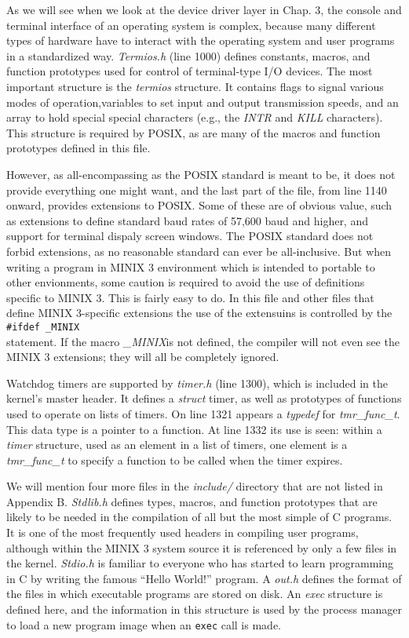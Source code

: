 \documentclass{book}
\newcommand {\sys} [1] {\textsl{#1}}
\newcommand {\cmd} [1] {\texttt{#1}}
\begin{document}
As we will see when we look at the device driver layer in Chap. 3,
the console and terminal interface of an operating system is complex,
because many different types of hardware have to interact with the operating system and user programs in a standardized way.
\sys{Termios.h} (line 1000) defines constants, macros, and function prototypes 
used for control of terminal-type I/O devices.
The most important structure is the \sys{termios} structure.
It contains flags to signal various modes of operation,variables to set input and output transmission speeds,
and an array to hold special special characters (e.g., the \sys{INTR} and \sys{KILL} characters).
This structure is required by POSIX,
as are many of the macros and function prototypes defined in this file.

However, as all-encompassing as the POSIX standard is meant to be, it does not provide everything one might want,
and the last part of the file, from line 1140 onward, provides extensions to POSIX.
Some of these are of obvious value, such as extensions to define standard baud rates of 57,600 baud and higher,
and support for terminal dispaly screen windows.
The POSIX standard does not forbid extensions, as no reasonable standard can ever be all-inclusive.
But when writing a program in MINIX 3 environment which is intended to portable to other envionments, 
some caution is required to avoid the use of definitions specific to MINIX 3.
This is fairly easy to do.
In this file and other files that define MINIX 3-specific extensions the use of the extensuins is controlled by the \\
\cmd{\#ifdef \_MINIX}\\
statement.
If the macro \sys{\_MINIX}is not defined, the compiler will not even see the MINIX 3 extensions;
they will all be completely ignored.

Watchdog timers are supported by \sys{timer.h} (line 1300),
which is included in the kernel's master header.
It defines a \sys{struct} timer, as well as prototypes of functions used to operate on lists of timers.
On line 1321 appears a \sys{typedef} for \sys{tmr\_func\_t}.
This data type is a pointer to a function.
At line 1332 its use is seen: within a \sys{timer} structure, used as an element in a list of timers,
one element is a \sys{tmr\_func\_t} to specify a function to be called when the timer expires.

We will mention four more files in the \sys{include/} directory that are not listed in Appendix B.
\sys{Stdlib.h} defines types, macros, and function prototypes 
that are likely to be needed in the compilation of all but the most simple of C programs.
It is one of the most frequently used headers in compiling user programs,
although within the MINIX 3 system source it is referenced by only a few files in the kernel.
\sys{Stdio.h} is familiar to everyone who has started to learn programming in C by writing the famous  ``Hello World!'' program.
A \sys{out.h} defines the format of the files in which executable programs are stored on disk.
An \sys{exec} structure is defined here, and the information in this structure is used by the process manager 
to load a new program image when an \cmd{exec} call is made.
\end{document}
